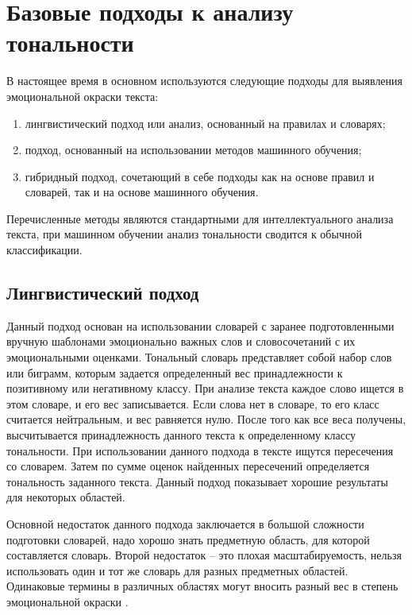 \documentclass[a4paper,14pt, unknownkeysallowed]{extreport}
\begin{document}
\section{Базовые подходы к анализу тональности}

В настоящее время в основном используются следующие подходы для выявления эмоциональной окраски текста:
\begin{enumerate}
	\item лингвистический подход или анализ, основанный на правилах и словарях; 
	\item подход, основанный на использовании методов машинного обучения; 
	\item гибридный подход, сочетающий в себе подходы как на основе правил и словарей, так и на основе машинного обучения. 
\end{enumerate}	

Перечисленные методы являются стандартными для интеллектуального анализа текста, при машинном обучении анализ тональности сводится к обычной классификации.
	
	\subsection{Лингвистический подход}
	
	Данный подход основан на использовании словарей с заранее подготовленными вручную шаблонами эмоционально важных слов и словосочетаний с их эмоциональными оценками. Тональный словарь представляет собой набор слов или биграмм, которым задается определенный вес принадлежности к позитивному или негативному классу. При анализе текста каждое слово ищется в этом словаре, и его вес записывается. Если слова нет в словаре, то его класс считается нейтральным, и вес равняется нулю. После того как все веса получены, высчитывается принадлежность данного текста к определенному классу тональности. При использовании данного подхода в тексте ищутся пересечения со словарем. Затем по сумме оценок найденных пересечений определяется тональность заданного текста. Данный подход показывает хорошие результаты для некоторых областей. 
	
	Основной недостаток данного подхода заключается в большой сложности подготовки словарей, надо хорошо знать предметную область, для которой составляется словарь. Второй недостаток -- это плохая масштабируемость, нельзя использовать один и тот же словарь для разных предметных областей. Одинаковые термины в различных областях могут вносить разный вес в степень эмоциональной окраски \cite{Samigulin}.
	
\end{document}
